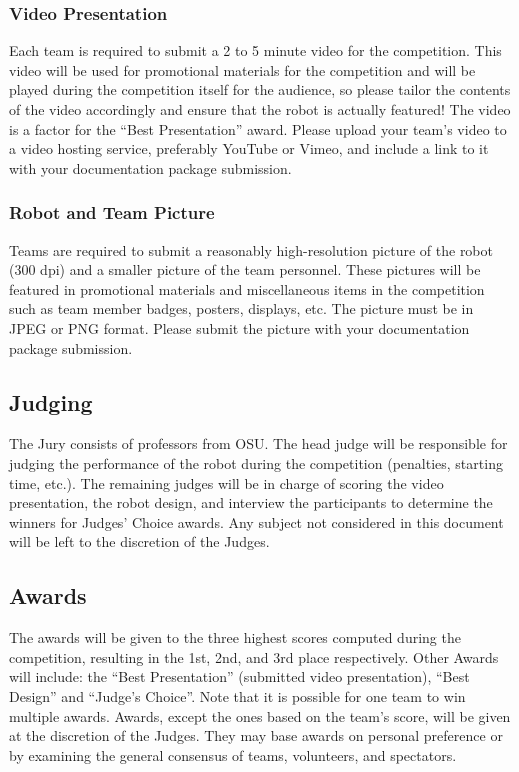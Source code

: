 \subsubsection{Video Presentation}
Each team is required to submit a 2 to 5 minute video for the competition. This video will be used for promotional materials for the competition and will be played during the competition itself for the audience, so please tailor the contents of the video accordingly and ensure that the robot is actually featured! The video is a factor for the “Best Presentation” award. Please upload your team’s video to a video hosting service, preferably YouTube or Vimeo, and include a link to it with your documentation package submission. 

\subsubsection{Robot and Team Picture}
Teams are required to submit a reasonably high-resolution picture of the robot (300 dpi) and a smaller picture of the team personnel. These pictures will be featured in promotional materials and miscellaneous items in the competition such as team member badges, posters, displays, etc. The picture must be in JPEG or PNG format. Please submit the picture with your documentation package submission.

\subsection{Judging}
The Jury consists of professors from OSU. The head judge will be responsible for judging the performance of the robot during the competition (penalties, starting time, etc.). The remaining judges will be in charge of scoring the video presentation, the robot design, and interview the participants to determine the winners for Judges’ Choice awards. 
Any subject not considered in this document will be left to the discretion of the Judges.

\subsection{Awards}
The awards will be given to the three highest scores computed during the competition, resulting in the 1st, 2nd, and 3rd place respectively. Other Awards will include: the “Best Presentation” (submitted video presentation), “Best Design” and “Judge's Choice”. Note that it is possible for one team to win multiple awards. 
Awards, except the ones based on the team’s score, will be given at the discretion of the Judges. They may base awards on personal preference or by examining the general consensus of teams, volunteers, and spectators. 